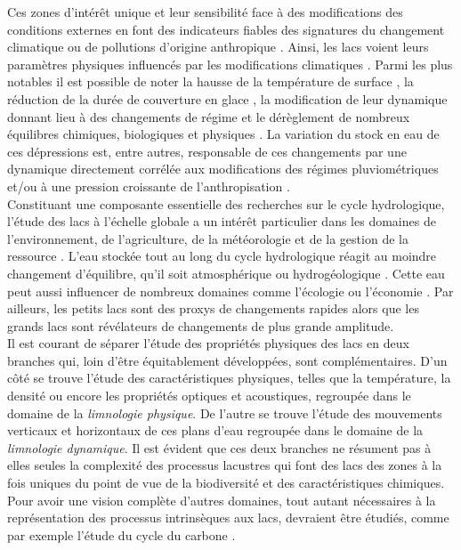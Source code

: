 Ces zones d'intérêt unique et leur sensibilité face à des modifications des conditions externes en font des indicateurs fiables des signatures du changement climatique ou de pollutions d'origine anthropique \citep{vincent2009,IPCC2013}. Ainsi, les lacs voient leurs paramètres physiques influencés par les modifications climatiques \citep{adrian2009}. Parmi les plus notables il est possible de noter  la hausse de la température de surface \citep{oreilly2015,woolway2017a}, la réduction de la durée de couverture en glace \citep{sharma2019}, la modification de leur dynamique donnant lieu à des changements de régime \citep{woolway2019} et le dérèglement de nombreux équilibres chimiques, biologiques et physiques \citep{yvon2012,kraemer2017}. La variation du stock en eau de ces dépressions est, entre autres, responsable de ces changements par une dynamique directement corrélée aux modifications des régimes pluviométriques et/ou à une pression croissante de l'anthropisation \citep{kolding2012,gownaris2018}.\\
Constituant une composante essentielle des recherches sur le cycle hydrologique, l’étude des lacs à l’échelle globale a un intérêt particulier dans les domaines de l’environnement, de l’agriculture, de la météorologie et de la gestion de la ressource \citep{schindler2009,seekell2014}. L’eau stockée tout au long du cycle hydrologique réagit au moindre changement d’équilibre, qu’il soit atmosphérique ou hydrogéologique \citep{dinka2014, bouchez2015, wang2018}. Cette eau peut aussi influencer de nombreux domaines comme l’écologie \citep{dudgeon2006} ou l’économie \citep{rast2000}. Par ailleurs, les petits lacs sont des proxys de changements rapides alors que les grands lacs sont révélateurs de changements de plus grande amplitude. \\
Il est courant de séparer l'étude des propriétés physiques des lacs en deux branches qui, loin d'être équitablement développées, sont complémentaires. D'un côté se trouve l'étude des caractéristiques physiques, telles que la température, la densité ou encore les propriétés optiques et acoustiques, regroupée dans le domaine de la \textit{limnologie physique}. De l'autre se trouve l'étude des mouvements verticaux et horizontaux de ces plans d'eau regroupée dans le domaine de la \textit{limnologie dynamique}. Il est évident que ces deux branches ne résument pas à elles seules la complexité des processus lacustres qui font des lacs des zones à la fois uniques du point de vue de la biodiversité et des caractéristiques chimiques. Pour avoir une vision complète d'autres domaines, tout autant nécessaires à la représentation des processus intrinsèques aux lacs, devraient être étudiés, comme par exemple l'étude du cycle du carbone \citep{tranvik2009}.

